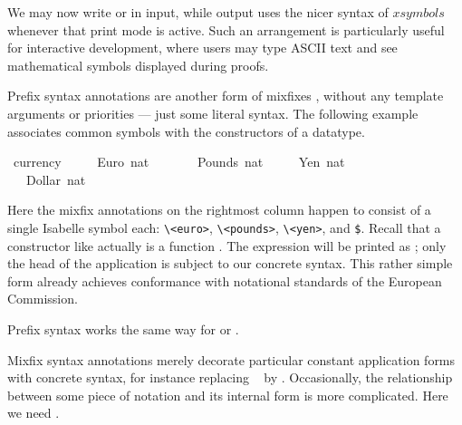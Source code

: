 \begin{isabellebody}
\begin{isamarkuptext}
  \medskip We may now write  or  in
  input, while output uses the nicer syntax of $xsymbols$ whenever
  that print mode is active.  Such an arrangement is particularly
  useful for interactive development, where users may type ASCII text
  and see mathematical symbols displayed during proofs.%
\end{isamarkuptext}%
\isamarkuptrue%
%
\isamarkuptrue%
%
\begin{isamarkuptext}%
Prefix syntax annotations are another form
  of mixfixes \cite{isabelle-ref}, without any template arguments or
  priorities --- just some literal syntax.  The following example
  associates common symbols with the constructors of a datatype.%
\end{isamarkuptext}%
\isamarkuptrue%
\ currency\ {\isacharequal}\isanewline
\ \ \ \ Euro\ nat\ \ \ \ {\isacharparenleft}{\isachardoublequote}{\isasymeuro}{\isachardoublequote}{\isacharparenright}\isanewline
\ \ {\isacharbar}\ Pounds\ nat\ \ {\isacharparenleft}{\isachardoublequote}{\isasympounds}{\isachardoublequote}{\isacharparenright}\isanewline
\ \ {\isacharbar}\ Yen\ nat\ \ \ \ \ {\isacharparenleft}{\isachardoublequote}{\isasymyen}{\isachardoublequote}{\isacharparenright}\isanewline
\ \ {\isacharbar}\ Dollar\ nat\ \ {\isacharparenleft}{\isachardoublequote}{\isachardollar}{\isachardoublequote}{\isacharparenright}\isamarkupfalse%
%
\begin{isamarkuptext}%
\noindent Here the mixfix annotations on the rightmost column happen
  to consist of a single Isabelle symbol each: \verb,\,\verb,<euro>,,
  \verb,\,\verb,<pounds>,, \verb,\,\verb,<yen>,, and \verb,$,.  Recall
  that a constructor like  actually is a function .  The expression  will be
  printed as ; only the head of the application is
  subject to our concrete syntax.  This rather simple form already
  achieves conformance with notational standards of the European
  Commission.

  Prefix syntax works the same way for  or
  .%
\end{isamarkuptext}%
\isamarkuptrue%
%
\isamarkuptrue%
%
\begin{isamarkuptext}%
Mixfix syntax annotations merely decorate particular constant
  application forms with concrete syntax, for instance replacing \
   by .  Occasionally, the
  relationship between some piece of notation and its internal form is
  more complicated.  Here we need \bfindex{syntax translations}.


\end{isamarkuptext}
\end{isabellebody}

